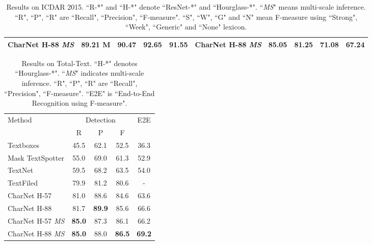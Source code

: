 \documentclass[10pt,twocolumn,letterpaper]{article}
\begin{document}
\begin{table*}[!t]
\begin{tabular}{l|c|c|c|c|l|c|c|c|c}
		CharNet H-88 \textit{MS} & 89.21 M & 90.47 & \textbf{92.65} & \textbf{91.55} & CharNet H-88  \textit{MS} & \textbf{85.05} & \textbf{81.25} & \textbf{71.08} & \textbf{67.24} \\
		\hline
	\end{tabular}
	\vspace{-2mm}
	\caption{Results on ICDAR 2015.  ``R-*" and ``H-*" denote ``ResNet-*" and ``Hourglass-*".  ``\textit{MS}" means multi-scale inference.  ``R", ``P", ``R" are ``Recall", ``Precision", ``F-measure". ``S", ``W", ``G" and ``N" mean F-measure using ``Strong", ``Week", ``Generic" and ``None" lexicon. }
	\label{tab:results_icdar15}
\end{table*}


\begin{table}[!t]
    \centering
\begin{tabular}{l|c|c|c|c}
	    \hline
		\multirow{2}{*}{Method} & \multicolumn{3}{c|}{Detection} & \multirow{2}{*}{E2E} \\
		\cline{2-4} & R & P & F \\
        \hline
        Textboxes \cite{liao2017textboxes} & 45.5 & 62.1 & 52.5 & 36.3 \\
  		Mask TextSpotter \cite{lyu2018mask} & 55.0 & 69.0 & 61.3 & 52.9 \\
  		TextNet \cite{sun2018textnet} & 59.5 & 68.2 & 63.5 & 54.0 \\
  		TextFiled \cite{xu2019textfield} & 79.9 & 81.2 & 80.6 & - \\
        \hline\hline
		CharNet H-57 & 81.0 & 88.6 & 84.6 & 63.6 \\
		CharNet H-88 & 81.7 & \textbf{89.9} & 85.6 & 66.6 \\
		CharNet H-57 \textit{MS} & \textbf{85.0} & 87.3 & 86.1 & 66.2 \\
		CharNet H-88 \textit{MS} & \textbf{85.0} & 88.0 & \textbf{86.5} & \textbf{69.2} \\
		\hline
	\end{tabular}
	\vspace{-2mm}
	\caption{Results on Total-Text.  ``H-*" denotes ``Hourglass-*". ``\textit{MS}" indicates multi-scale inference.  ``R", ``P", ``R" are ``Recall", ``Precision", ``F-measure".  ``E2E" is ``End-to-End Recognition using F-measure".}
	\label{tab:results_totaltext}
\end{table}
\end{document}
